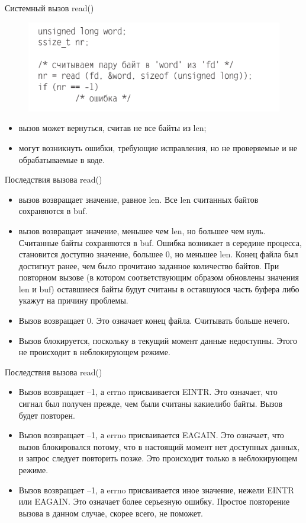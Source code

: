 \documentclass{beamer}
\begin{document}
\begin{frame}{Системный вызов read()}
\begin{figure}[h]
\centering
\includegraphics[scale=0.6]{images/lec06-pic08.png}
\end{figure}
\begin{itemize}
\item вызов может вернуться, считав не все байты из len; 
\item могут возникнуть ошибки, требующие исправления, но не проверяемые и не обрабатываемые в коде.
\end{itemize}
\end{frame}

\begin{frame}{Последствия вызова read()}
\begin{itemize}
\item вызов возвращает значение, равное len. Все len считанных байтов сохраняются
в buf. 
\item вызов возвращает значение, меньшее чем len, но большее чем нуль. Считанные
байты сохраняются в buf. Ошибка возникает в середине процесса, становится доступно значение, большее 0, но меньшее len. Конец файла был достигнут ранее, чем было прочитано заданное количество байтов. При повторном вызове (в котором соответствующим образом обновлены значения len и buf) оставшиеся байты будут считаны в оставшуюся часть буфера либо укажут на причину проблемы.
\item Вызов возвращает 0. Это означает конец файла. Считывать больше нечего.
\item Вызов блокируется, поскольку в текущий момент данные недоступны. Этого не
происходит в неблокирующем режиме.
\end{itemize}
\end{frame}

\begin{frame}{Последствия вызова read()}
\begin{itemize}
\item Вызов возвращает –1, а errno присваивается EINTR. Это означает, что сигнал был получен прежде, чем были считаны какие­либо байты. Вызов будет повторен.
\item Вызов возвращает –1, а errno присваивается EAGAIN. Это означает, что вызов
блокировался потому, что в настоящий момент нет доступных данных, и запрос
следует повторить позже. Это происходит только в неблокирующем режиме.
\item Вызов возвращает –1, а errno присваивается иное значение, нежели EINTR или
EAGAIN. Это означает более серьезную ошибку. Простое повторение вызова в данном случае, скорее всего, не поможет.
\end{itemize}
\end{frame}
\end{document}
